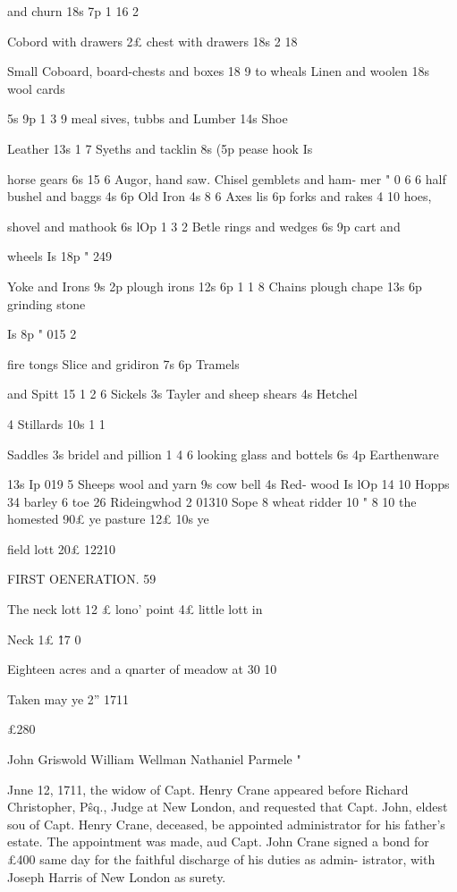\documentclass{book}
\begin{document}
and churn 18s  7p 1  16  2 

Cobord with drawers 2£ chest with drawers 18s 2  18  

Small Coboard, board-chests and boxes  18  9 
to wheals Linen and woolen 18s wool cards 

5s 9p 1 3 9 
meal sives, tubbs and Lumber 14s Shoe 

Leather 13s 1  7  
Syeths and tacklin 8s  (5p pease hook Is 

horse gears 6s   15  6 
Augor, hand saw. Chisel gemblets and ham- 
mer " 0 6 6 
half bushel and baggs 4s  6p Old Iron 4s  8  6 
Axes lis  6p forks and rakes 4  10 hoes, 

shovel and mathook 6s  lOp 1  3  2 
Betle rings and wedges 6s  9p cart and 

wheels Is 18p " 249 

Yoke and Irons 9s  2p plough irons 12s  6p 1  1  8 
Chains plough chape 13s  6p grinding stone 

Is 8p " 015 2 

fire tongs Slice and gridiron 7s  6p Tramels 

and Spitt 15 1  2  6 
Sickels 3s Tayler and sheep shears 4s Hetchel 

4 Stillards 10s 1 1 

Saddles 3s bridel and pillion 1  4  6 
looking glass and bottels 6s  4p Earthenware 

13s Ip 019 5 
Sheeps wool and yarn 9s cow bell 4s Red- 
wood Is  lOp  14  10 
Hopps 34 barley 6 toe 26 Rideingwhod 2 01310 
Sope 8 wheat ridder 10  "  8  10 
the homested 90£ ye pasture 12£  10s ye 

field lott 20£ 12210 



FIRST OENERATION. 59 

The neck lott 12 £ lono' point 4£ little lott in 

Neck 1£ \^ 17 0 

Eighteen acres and a qnarter of meadow at 30  10  



Taken may ye 2'' 1711 



£280   

John Griswold 
William Wellman 
Nathaniel Parmele " 



Jnne 12, 1711, the widow of Capt. Henry Crane appeared 
before Richard Christopher, P\^sq., Judge at New London, and 
requested that Capt. John, eldest sou of Capt. Henry Crane, 
deceased, be appointed administrator for his father's estate. The 
appointment was made, aud Capt. John Crane signed a bond for 
£400 same day for the faithful discharge of his duties as admin- 
istrator, with Joseph Harris of New London as surety. 
\end{document}
